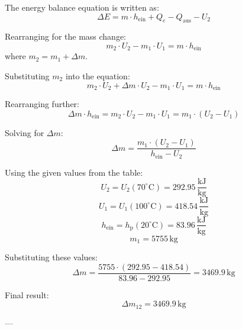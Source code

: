 The energy balance equation is written as:  
\[
\Delta E = m \cdot h_{\text{ein}} + Q_e - Q_{\text{aus}} - U_2
\]  

Rearranging for the mass change:  
\[
m_2 \cdot U_2 - m_1 \cdot U_1 = m \cdot h_{\text{ein}}
\]  
where \( m_2 = m_1 + \Delta m \).  

Substituting \( m_2 \) into the equation:  
\[
m_2 \cdot U_2 + \Delta m \cdot U_2 - m_1 \cdot U_1 = m \cdot h_{\text{ein}}
\]  

Rearranging further:  
\[
\Delta m \cdot h_{\text{ein}} = m_2 \cdot U_2 - m_1 \cdot U_1 = m_1 \cdot (U_2 - U_1)
\]  

Solving for \( \Delta m \):  
\[
\Delta m = \frac{m_1 \cdot (U_2 - U_1)}{h_{\text{ein}} - U_2}
\]  

Using the given values from the table:  
\[
U_2 = U_2(70^\circ\text{C}) = 292.95 \, \frac{\text{kJ}}{\text{kg}}
\]  
\[
U_1 = U_1(100^\circ\text{C}) = 418.54 \, \frac{\text{kJ}}{\text{kg}}
\]  
\[
h_{\text{ein}} = h_{\text{p}}(20^\circ\text{C}) = 83.96 \, \frac{\text{kJ}}{\text{kg}}
\]  
\[
m_1 = 5755 \, \text{kg}
\]  

Substituting these values:  
\[
\Delta m = \frac{5755 \cdot (292.95 - 418.54)}{83.96 - 292.95} = 3469.9 \, \text{kg}
\]  

Final result:  
\[
\Delta m_{12} = 3469.9 \, \text{kg}
\]  

---